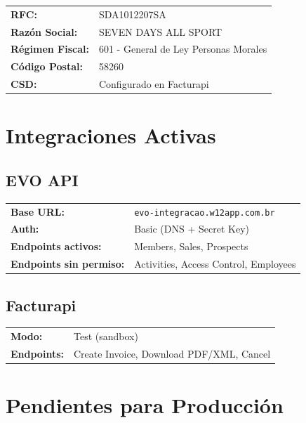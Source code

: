 \documentclass[11pt,a4paper]{article}
\begin{document}
\begin{tabularx}{\textwidth}{lX}
  \textbf{RFC:} & SDA1012207SA \\
  \textbf{Razón Social:} & SEVEN DAYS ALL SPORT \\
  \textbf{Régimen Fiscal:} & 601 - General de Ley Personas Morales \\
  \textbf{Código Postal:} & 58260 \\
  \textbf{CSD:} & Configurado en Facturapi \\
\end{tabularx}

\section*{Integraciones Activas}

\subsection*{EVO API}
\begin{tabularx}{\textwidth}{lX}
  \textbf{Base URL:} & \texttt{evo-integracao.w12app.com.br} \\
  \textbf{Auth:} & Basic (DNS + Secret Key) \\
  \textbf{Endpoints activos:} & Members, Sales, Prospects \\
  \textbf{Endpoints sin permiso:} & Activities, Access Control, Employees \\
\end{tabularx}

\subsection*{Facturapi}
\begin{tabularx}{\textwidth}{lX}
  \textbf{Modo:} & Test (sandbox) \\
  \textbf{Endpoints:} & Create Invoice, Download PDF/XML, Cancel \\
\end{tabularx}

\section*{Pendientes para Producción}
\end{document}
